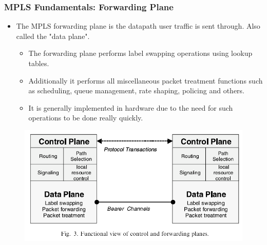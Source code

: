 \documentclass[12pt]{beamer}
\begin{document}
\begin{frame}
	\frametitle{MPLS Fundamentals: Forwarding Plane}
    \begin{itemize}
    \item The MPLS forwarding plane is the datapath user traffic is sent through. Also called the "data plane".
	    \begin{itemize}
		    \item The forwarding plane performs label swapping operations using lookup tables.
            \item Additionally it performs all miscellaneous packet treatment functions such as scheduling, queue management, rate shaping, policing and others.
		    \item It is generally implemented in hardware due to the need for such operations to be done really quickly.
	    \end{itemize}
    \end{itemize}
	\begin{figure}[h]
		\begin{center}
			\includegraphics[scale=0.35]{label.png}
		\end{center}
	\end{figure}	
\end{frame}
\end{document}
